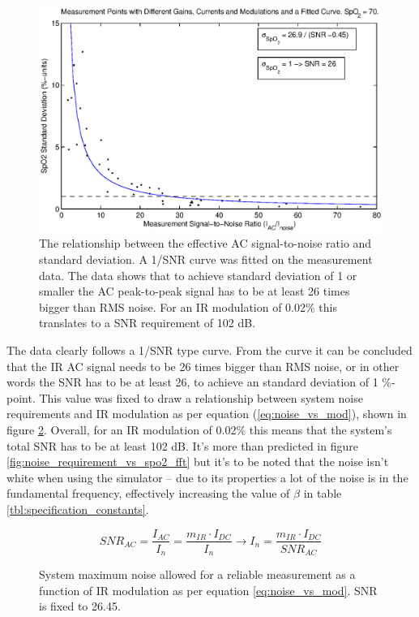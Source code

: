 \begin{figure}[htcb]
	\includegraphics[scale=0.9]{kuvat/measurements/spo2_error_vs_measurement_snr.eps}
	\caption{The relationship between the effective AC signal-to-noise ratio and \spo standard deviation. A 1/SNR curve was fitted on the measurement data. The data shows that to achieve \spo standard deviation of 1 or smaller the AC peak-to-peak signal has to be at least 26 times bigger than RMS noise. For an IR modulation of 0.02\% this translates to a SNR requirement of 102 dB.}
	\label{fig:spo2_noise_vs_snr}
\end{figure}

The data clearly follows a 1/SNR type curve. From the curve it can be concluded that the IR AC signal needs to be 26 times bigger than RMS noise, or in other words the SNR has to be at least 26, to achieve an \spo standard deviation of 1 \%-point. This value was fixed to draw a relationship between system noise requirements and IR modulation as per equation (\ref{eq:noise_vs_mod}), shown in figure \ref{fig:noise_vs_mod}. Overall, for an IR modulation of 0.02\% this means that the system's total SNR has to be at least 102 dB. It's more than predicted in figure \ref{fig:noise_requirement_vs_spo2_fft} but it's to be noted that the noise isn't white when using the simulator -- due to its properties a lot of the noise is in the fundamental frequency, effectively increasing the value of $\beta$ in table \ref{tbl:specification_constants}.

\begin{equation}
  SNR_{AC} = \frac{I_{AC}}{I_n} = \frac{m_{IR} \cdot I_{DC}}{I_n} \rightarrow I_n = \frac{m_{IR} \cdot I_{DC}}{SNR_{AC}}
  \label{eq:noise_vs_mod}
\end{equation}

\begin{figure}[htcb]
	\caption{System maximum noise allowed for a reliable measurement as a function of IR modulation as per equation \ref{eq:noise_vs_mod}. SNR is fixed to 26.45.}
	\label{fig:noise_vs_mod}
\end{figure}

